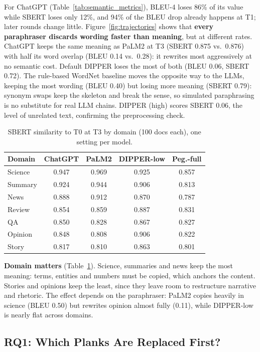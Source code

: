 For ChatGPT (Table~\ref{tab:semantic_metrics}), BLEU-4 loses 86\% of its value while SBERT loses
only 12\%, and 94\% of the BLEU drop already happens at T1; later rounds change little.
Figure~\ref{fig:trajectories} shows that \textbf{every paraphraser discards wording faster than
meaning}, but at different rates. ChatGPT keeps the same meaning as PaLM2 at T3 (SBERT 0.875 vs.\
0.876) with half its word overlap (BLEU 0.14 vs.\ 0.28): it rewrites most aggressively at no
semantic cost. Default DIPPER loses the most of both (BLEU 0.06, SBERT 0.72). The rule-based
WordNet baseline moves the opposite way to the LLMs, keeping the most wording (BLEU 0.40) but
losing more meaning (SBERT 0.79): synonym swaps keep the skeleton and break the sense, so
simulated paraphrasing is no substitute for real LLM chains. DIPPER (high) scores SBERT 0.06, the
level of unrelated text, confirming the preprocessing check.

\begin{table}[t]
\small
\centering
\caption{SBERT similarity to T0 at T3 by domain (100 docs each), one setting per model.}
\label{tab:domain_metrics}
\begin{tabular}{lcccc}
\toprule
\textbf{Domain} & \textbf{ChatGPT} & \textbf{PaLM2} & \textbf{DIPPER-low} & \textbf{Peg.-full} \\
\midrule
Science  & 0.947 & 0.969 & 0.925 & 0.857 \\
Summary  & 0.924 & 0.944 & 0.906 & 0.813 \\
News     & 0.888 & 0.912 & 0.870 & 0.787 \\
Review   & 0.854 & 0.859 & 0.887 & 0.831 \\
QA       & 0.850 & 0.828 & 0.867 & 0.827 \\
Opinion  & 0.848 & 0.808 & 0.906 & 0.822 \\
Story    & 0.817 & 0.810 & 0.863 & 0.801 \\
\bottomrule
\end{tabular}
\end{table}

\textbf{Domain matters} (Table~\ref{tab:domain_metrics}). Science, summaries and news keep the most
meaning: terms, entities and numbers must be copied, which anchors the content. Stories and
opinions keep the least, since they leave room to restructure narrative and rhetoric. The effect
depends on the paraphraser: PaLM2 copies heavily in science (BLEU 0.50) but rewrites opinion
almost fully (0.11), while DIPPER-low is nearly flat across domains.

\subsection{RQ1: Which Planks Are Replaced First?}
\label{sec:rq1}

